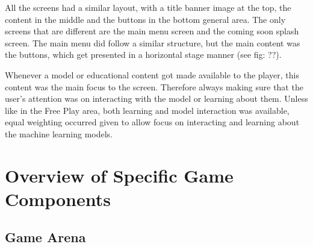 	All the screens had a similar layout, with a title banner image at the top, the content in the middle and the buttons in the bottom general area. The only screens that are different are the main menu screen and the coming soon splash screen. The main menu did follow a similar structure, but the main content was the buttons, which get presented in a horizontal stage manner (see fig: ??).
	
	Whenever a model or educational content got made available to the player, this content was the main focus to the screen. Therefore always making sure that the user's attention was on interacting with the model or learning about them. Unless like in the Free Play area, both learning and model interaction was available, equal weighting occurred given to allow focus on interacting and learning about the machine learning models.
		
	
	
	
	
		
		
		
	\section{Overview of Specific Game Components}
		\label{sec:overview_game_components}
	
		
	\subsection{Game Arena}
	
